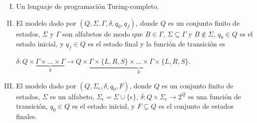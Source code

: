 \documentclass{article}
\begin{document}
\begin{enumerate}[I)]
\item Un lenguaje de programación Turing-completo.

\item El modelo dado por $(Q,\Sigma,\Gamma,\delta,q_0,q_f)$, donde $Q$ es un conjunto finito de estados, $\Sigma$ y
$\Gamma$ son alfabetos de modo que $B\in\Gamma$,  $\Sigma\subseteq\Gamma$ y $B \notin \Sigma$, $q_0\in Q$ es el estado inicial, y $q_f\in Q$ es el estado final y 
la función de transición es

\begin{small}
$\delta:Q\times\underbrace{\Gamma\times\ldots\times\Gamma}_k\rightarrow Q\times\underbrace{\Gamma\times\{L,R,S\}\times\ldots\times\Gamma\times\{L,R,S\}}_k$.
\end{small} 

\item El modelo dado por  $(Q,\Sigma_\epsilon,\delta,q_0,F)$, donde  $Q$ es un   conjunto finito de estados, $\Sigma$ es un alfabeto,
$\Sigma_\epsilon=\Sigma \cup \{\epsilon\}$, $\delta:Q\times \Sigma_\epsilon\rightarrow 2^{Q}$ 
es una funci\'on de transición, $q_0\in Q$ es el  estado inicial, y $F\subseteq Q$ es el conjunto de estados finales.

\end{enumerate}
\end{document}
